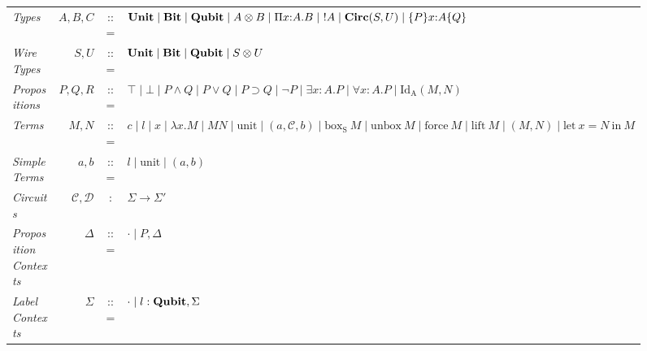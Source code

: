 \documentclass[acmsmall,nonacm,timestamp]{acmart}
\newcommand{\type}[1]{\textrm{\textbf{#1}}}
\begin{document}
\begin{figure}[h]
	\begin{tabular}{lrcl}
		\textit{Types} & $A, B, C$ & ::= & \begin{minipage}[t]{0.5\columnwidth}%
			$ \type{Unit} \mid \type{Bit} \mid \type{Qubit} \mid A \otimes B \mid \Pi x{ : }A.B \mid ~!A  \mid \type{Circ}(S, U) \mid \{P\} x{ : }A \{Q\}$
					\end{minipage}\\
		\textit{Wire Types} & $S, U$ & ::= & $ \type{Unit} \mid \type{Bit} \mid \type{Qubit} \mid S \otimes U$ \\
		\textit{Propositions} & $P, Q, R$ & ::= & \begin{minipage}[t]{0.5\columnwidth}%
			$ \top \mid \bot \mid P \wedge Q \mid P \vee Q \mid P \supset Q \mid \neg P \mid \exists x{:}A.P \mid \forall x{:}A.P \mid \mathrm{Id_A}(M, N)$
		\end{minipage}\\
		\textit{Terms} & $M, N$ & ::= & \begin{minipage}[t]{0.55\columnwidth}%
			$ c \mid l \mid x \mid \lambda x.M \mid MN \mid \mathrm{unit} \mid (a, \mathcal{C}, b) \mid \mathrm{box_S}~M \mid \mathrm{unbox}~M \mid \mathrm{force}~M \mid \mathrm{lift}~M \mid (M, N) \mid \mathrm{let}~ x = N ~\mathrm{in}~ M $
		\end{minipage}\\
		\textit{Simple Terms} & $a, b$ & ::= & $ l \mid \mathrm{unit} \mid (a, b)$ \\
		\textit{Circuits} & $\mathcal{C}, \mathcal{D}$ & : & $ \Sigma \to \Sigma' $ \\
		\textit{Proposition Contexts} & $\Delta$ & ::= & $ \cdot \mid P, \Delta$ \\
		\textit{Label Contexts} & $\Sigma$ & ::= & $ \cdot \mid l : \type{Qubit}, \Sigma$ \\

\end{tabular}
\end{figure}
\end{document}
